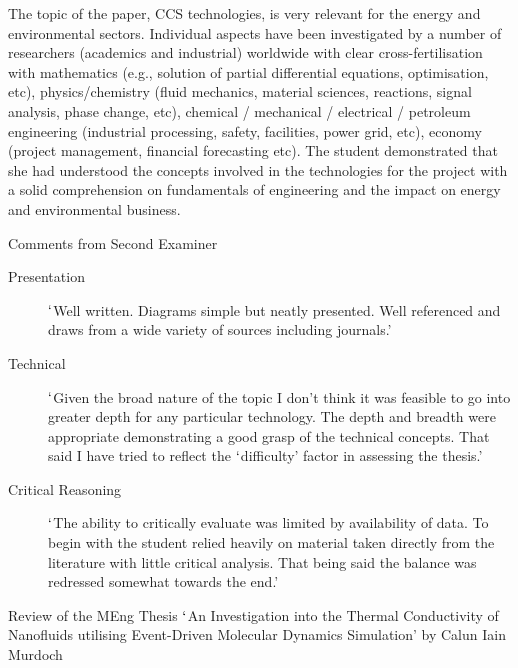 \documentclass[14pt,twoside]{report}
\begin{document}
The topic of the paper, CCS technologies, is very relevant for the energy and environmental sectors. Individual aspects have been investigated by a number of researchers (academics and industrial) worldwide with clear cross-fertilisation with mathematics (e.g., solution of partial differential equations, optimisation, etc), physics/chemistry (fluid mechanics, material sciences, reactions, signal analysis, phase change, etc), chemical / mechanical / electrical / petroleum engineering (industrial processing, safety, facilities, power grid, etc), economy (project management, financial forecasting etc). The student demonstrated that she had understood the concepts involved in the technologies for the project with a solid comprehension on fundamentals of engineering and the impact on energy and environmental business.    


\medskip
\noindent
{\Large Comments from Second Examiner}
\begin{description}
\item[Presentation] $\lq$Well written. Diagrams simple but neatly presented. Well referenced and draws from a wide variety of sources including journals.'
\item[Technical] $\lq$Given the broad nature of the topic I don't think it was feasible to go into greater depth for any particular technology. The depth and breadth were appropriate demonstrating a good grasp of the technical concepts. That said I have tried to reflect the $\lq$difficulty' factor in assessing the thesis.'
\item[Critical Reasoning]$\lq$The ability to critically evaluate was limited by availability of data. To begin with the student relied heavily on material taken directly from the literature with little critical analysis. That being said the balance was redressed somewhat towards the end.'
\end{description}
\clearpage




\bigskip

\begin{center}
  {\Large Review of the MEng Thesis $\lq$An Investigation into the Thermal Conductivity of Nanofluids utilising Event-Driven Molecular Dynamics Simulation' by Calun Iain Murdoch}
\end{center}

\medskip
\end{document}
